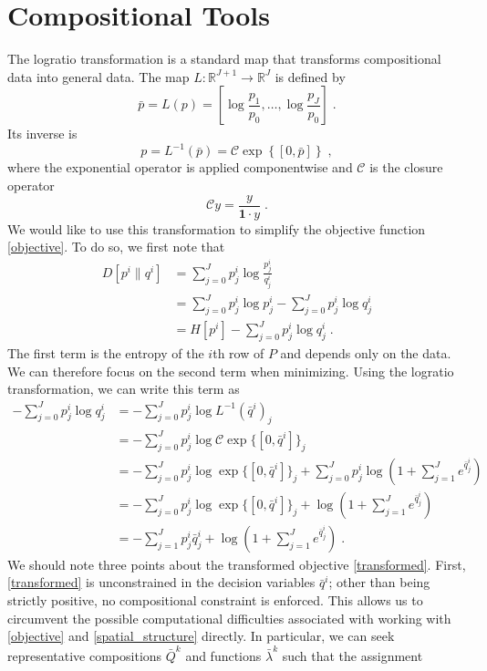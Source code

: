 \documentclass[english]{scrartcl}
\newcommand\R[0]{\mathbb{R}}
\begin{document}
\section{Compositional Tools}
	The logratio transformation is a standard map that transforms compositional data into general data. The map $L:\R^{J+1} \rightarrow \R^J$ is defined by 
	\begin{equation}
		\bar{p} = L(p) = \left[\log \frac{p_1}{p_0},\ldots,\log \frac{p_J}{p_0}\right]\;.
	\end{equation}
	Its inverse is 
	\begin{equation}
		p = L^{-1}(\bar{p}) = \mathcal{C}\exp\left\{[0, \bar{p}] \right\}\;, 
	\end{equation}
	where the exponential operator is applied componentwise and $\mathcal{C}$ is the closure operator 
	\begin{equation}
		\mathcal{C}y = \frac{y}{\mathbf{1}\cdot y} \;.
	\end{equation}
	We would like to use this transformation to simplify the objective function \eqref{objective}. To do so, we first note that  
	\begin{align}
		D[p^i\|q^i] &= \sum_{j = 0}^J p^i_j \log \frac{p^i_j}{q^i_j} \\
		&= \sum_{j = 0}^J p^i_j \log p_j^i - \sum_{j = 0}^J p^i_j \log q_j^i \\
		&= H[p^i] - \sum_{j = 0}^J p^i_j \log q_j^i\;.
	\end{align}
	The first term is the entropy of the $i$th row of $P$ and depends only on the data. We can therefore focus on the second term when minimizing. Using the logratio transformation, we can write this term as 
	\begin{align}
		- \sum_{j = 0}^J p^i_j \log q_j^i &= - \sum_{j = 0}^J p^i_j \log L^{-1}(\bar{q}^i)_j \\
		&= - \sum_{j = 0}^J p^i_j \log \mathcal{C}\exp\{[0,\bar{q}^i]\}_j \\
		&= - \sum_{j = 0}^J p^i_j \log \exp\{[0,\bar{q}^i]\}_j + \sum_{j=0}^J p^i_j \log \left(1 + \sum_{j = 1}^J e^{\bar{q}^i_j}\right)\\ 
		&= - \sum_{j = 0}^J p^i_j \log \exp\{[0,\bar{q}^i]\}_j + \log \left(1 + \sum_{j = 1}^J e^{\bar{q}^i_j}\right) \\
		&= - \sum_{j = 1}^J p^i_j \bar{q}^i_j  + \log \left(1 + \sum_{j = 1}^J e^{\bar{q}^i_j}\right)\;. \label{transformed}
	\end{align}
	We should note three points about the transformed objective \eqref{transformed}. First, \eqref{transformed} is unconstrained in the decision variables $\bar{q}^i$; other than being strictly positive, no compositional constraint is enforced. This allows us to circumvent the possible computational difficulties associated with working with \eqref{objective} and \eqref{spatial_structure} directly. In particular, we can seek representative compositions $\bar{Q}^k$ and functions $\bar{\lambda}^k$ such that the assignment 
\end{document}
